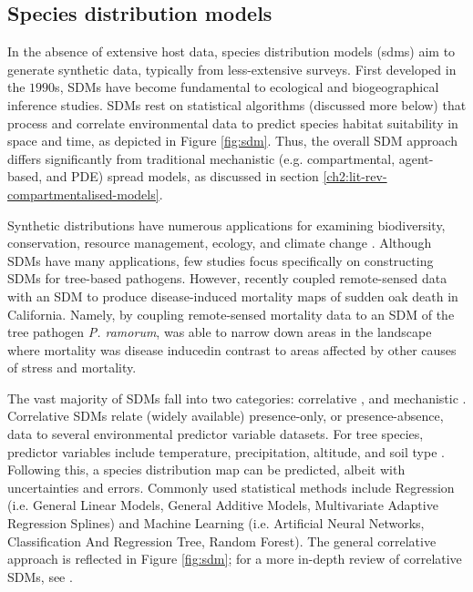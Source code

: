 \subsection{Species distribution models}

In the absence of extensive host data, species distribution models (\acrshort{sdm}s) aim to generate synthetic data, typically from less-extensive surveys. First developed in the $1990$s, SDMs have become fundamental to ecological and biogeographical inference studies. SDMs rest on statistical algorithms (discussed more below) that process and correlate environmental data to predict species habitat suitability in space and time, as depicted in Figure \ref{fig:sdm}. Thus, the overall SDM approach differs significantly from traditional mechanistic (e.g. compartmental, agent-based, and PDE) spread models, as discussed in section \ref{ch2:lit-rev-compartmentalised-models}.

Synthetic distributions have numerous applications for examining biodiversity, conservation, resource management, ecology, and climate change \cite{franklin2013species, skov2016real, wittmann2016confronting, 10.3958/059.037.0110, zhang2019using}. Although SDMs have many applications, few studies focus specifically on constructing SDMs for tree-based pathogens. However, recently \cite{he2019integrating} coupled remote-sensed data with an SDM to produce disease-induced mortality maps of sudden oak death in California. Namely, by coupling remote-sensed mortality data to an SDM of the tree pathogen \textit{P. ramorum}, \cite{he2019integrating} was able to narrow down areas in the landscape where mortality was disease induced\textemdash in contrast to areas affected by other causes of stress and mortality.
  
The vast majority of SDMs fall into two categories: correlative \cite{srivastava2019species}, and mechanistic \cite{shabani2016comparison}.
Correlative SDMs relate (widely available) presence-only, or presence-absence, data to several environmental predictor variable datasets.
For tree species, predictor variables include temperature, precipitation, altitude, and soil type \cite{ray2021multi, hill.data}.
Following this, a species distribution map can be predicted, albeit with  uncertainties and errors.
Commonly used statistical methods include Regression 
(i.e. General Linear Models, General Additive Models, Multivariate Adaptive Regression Splines) and Machine Learning
(i.e. Artificial Neural Networks, Classification And Regression Tree, Random Forest). 
The general correlative approach is reflected in Figure \ref{fig:sdm}; for a more in-depth review of correlative SDMs, see \cite{SDM_1}.

